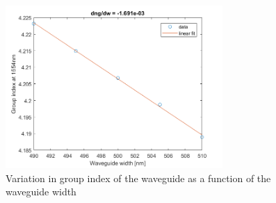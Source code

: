 \documentclass[journal]{IEEEtran}
\begin{document}
\begin{figure}[t!]
  \centering
  \includegraphics[width = 3.25in]{fig/dngdw.png}
  \caption{Variation in group index of the waveguide as a function of the waveguide width}
  \label{fig:dngdw}
\end{figure}


% 




\end{document}
